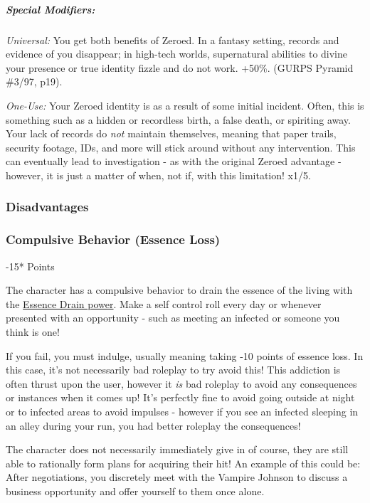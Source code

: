 \begin{multicols*}{3}
	\subparagraph{Special Modifiers:}
	
	\textit{Universal:} You get both benefits of Zeroed. In a fantasy setting, records and evidence of you disappear; in high-tech worlds, supernatural abilities to divine your presence or true identity fizzle and do not work. +50\%. (GURPS Pyramid \#3/97, p19). 
	
	\textit{One-Use:} Your Zeroed identity is as a result of some initial incident. Often, this is something such as a hidden or recordless birth, a false death, or spiriting away. Your lack of records do \textit{not} maintain themselves, meaning that paper trails, security footage, IDs, and more will stick around without any intervention. This can eventually lead to investigation - as with the original Zeroed advantage - however, it is just a matter of when, not if, with this limitation! x1/5.
	
	\subsubsection{Disadvantages}
	
	\subsubsection*{Compulsive Behavior (Essence Loss)}
	\begin{flushright}
		-15* Points
	\end{flushright}
	
	The character has a compulsive behavior to drain the essence of the living with the \hyperref[essence_drain]{Essence Drain power}. Make a self control roll every day or whenever presented with an opportunity - such as meeting an infected or someone you think is one!
	
	If you fail, you must indulge, usually meaning taking -10 points of essence loss. In this case, it's not necessarily bad roleplay to try avoid this! This addiction is often thrust upon the user, however it \textit{is} bad roleplay to avoid any consequences or instances when it comes up! It's perfectly fine to avoid going outside at night or to infected areas to avoid impulses - however if you see an infected sleeping in an alley during your run, you had better roleplay the consequences!
	
	The character does not necessarily immediately give in of course, they are still able to rationally form plans for acquiring their hit! An example of this could be: After negotiations, you discretely meet with the Vampire Johnson to discuss a business opportunity and offer yourself to them once alone.
	

\end{multicols*}
